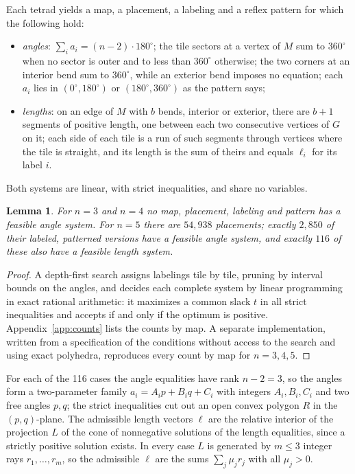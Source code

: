 \documentclass[11pt]{article}
\newtheorem{lemma}[theorem]{Lemma}
\theoremstyle{definition}
\theoremstyle{remark}
\begin{document}
Each tetrad yields a map, a placement, a labeling and a reflex pattern for
which the following hold:
\begin{itemize}
\item \emph{angles}: $\sum_i a_i=(n-2)\cdot180^\circ$; the tile sectors at a
vertex of $M$ sum to $360^\circ$ when no sector is outer and to less than
$360^\circ$ otherwise; the two corners at an interior bend sum to
$360^\circ$, while an exterior bend imposes no equation; each $a_i$ lies in
$(0^\circ,180^\circ)$ or $(180^\circ,360^\circ)$ as the pattern says;
\item \emph{lengths}: on an edge of $M$ with $b$ bends, interior or
exterior, there are $b+1$ segments of positive length, one between each
two consecutive vertices of $G$ on it; each side of each tile is a run of such
segments through vertices where the tile is straight, and its length is
the sum of theirs and equals $\ell_i$ for its label $i$.
\end{itemize}
Both systems are linear, with strict inequalities, and share no
variables.

\begin{lemma}\label{lem:linear}
For $n=3$ and $n=4$ no map, placement, labeling and pattern has a feasible
angle system. For $n=5$ there are $54{,}938$ placements; exactly $2{,}850$
of their labeled, patterned versions have a feasible angle system, and
exactly $116$ of these also have a feasible length system.
\end{lemma}

\begin{proof}
A depth-first search assigns labelings tile by tile, pruning by interval
bounds on the angles, and decides each complete system by linear
programming in exact rational arithmetic: it maximizes a common slack $t$
in all strict inequalities and accepts if and only if the optimum is
positive. Appendix~\ref{app:counts} lists the counts by map. A separate
implementation, written from a specification of the conditions without
access to the search and using exact polyhedra, reproduces every count by map
for $n=3,4,5$.
\end{proof}

For each of the 116 cases the angle equalities have rank $n-2=3$, so the
angles form a two-parameter family $a_i=A_ip+B_iq+C_i$ with integers
$A_i,B_i,C_i$ and two free angles $p,q$; the strict inequalities cut out an
open convex polygon $R$ in the $(p,q)$-plane. The admissible length vectors
$\ell$ are the relative interior of the projection $L$ of the cone of
nonnegative solutions of the length equalities, since a strictly positive
solution exists. In every case $L$ is generated by $m\le3$ integer rays
$r_1,\dots,r_m$, so the admissible $\ell$ are the sums $\sum_j\mu_jr_j$ with
all $\mu_j>0$.
\end{document}
